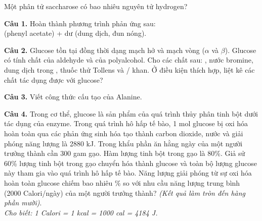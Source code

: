 \documentclass[11pt,a4paper]{article}
\begin{document}
\begin{ex}
Một phân tử saccharose có bao nhiêu nguyên tử hydrogen?
\end{ex}

\vspace{6pt}
\vspace{4pt}

\noindent\textbf{Câu 1.} Hoàn thành phương trình phản ứng sau:\\
 (phenyl acetate) +  dư (dung dịch, đun nóng).

\vspace{6pt}

\vspace{6pt}
\noindent\textbf{Câu 2.} Glucose tồn tại đồng thời dạng mạch hở và mạch vòng ($\alpha$ và $\beta$). Glucose có tính chất của aldehyde và của polyalcohol. Cho các chất sau: , nước bromine, dung dịch  trong , thuốc thử Tollens và / khan. Ở điều kiện thích hợp, liệt kê các chất tác dụng được với glucose?

\vspace{6pt}

\vspace{6pt}
\noindent\textbf{Câu 3.} Viết công thức cấu tạo của Alanine.

\vspace{6pt}

\vspace{6pt}
\noindent\textbf{Câu 4.} Trong cơ thể, glucose là sản phẩm của quá trình thủy phân tinh bột dưới tác dụng của enzyme. Trong quá trình hô hấp tế bào, 1 mol glucose bị oxi hóa hoàn toàn qua các phản ứng sinh hóa tạo thành carbon dioxide, nước và giải phóng năng lượng là 2880 kJ. Trong khẩu phần ăn hằng ngày của một người trưởng thành cần 300 gam gạo. Hàm lượng tinh bột trong gạo là 80\%. Giả sử 60\% lượng tinh bột trong gạo chuyển hóa thành glucose và toàn bộ lượng glucose này tham gia vào quá trình hô hấp tế bào. Năng lượng giải phóng từ sự oxi hóa hoàn toàn glucose chiếm bao nhiêu \% so với nhu cầu năng lượng trung bình (2000 Calori/ngày) của một người trưởng thành? \textit{(Kết quả làm tròn đến hàng phần mười)}.\\
\textit{Cho biết: 1 Calori = 1 kcal = 1000 cal = 4184 J.}
\end{document}

